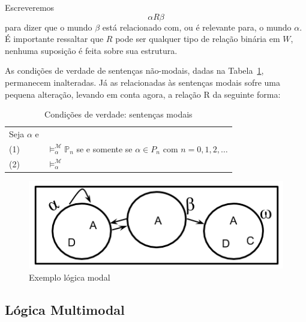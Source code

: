 Escreveremos
\begin{equation}
    \alpha R \beta
\end{equation}
para dizer que o mundo $\beta$ está relacionado com, ou é relevante para, o
mundo $\alpha$. É importante ressaltar que $R$ pode ser qualquer tipo de relação
binária em $W$, nenhuma suposição é feita sobre sua estrutura.

As condições de verdade de sentenças não-modais, dadas na
Tabela~\ref{table:truth}, permanecem inalteradas. Já as relacionadas às
sentenças modais sofre uma pequena alteração, levando em conta agora, a relação
R da seguinte forma:

    \begin{table}[h!]
\label{table:truth}
\begin{center}
    \caption{Condições de verdade: sentenças modais}
    \begin{tabular}{ll}
    Seja $\alpha$ e  \\

        \vspace{2mm}
        (1) & $\models ^{\mathcal{M}}_{\alpha} \mathbb{P}_n$ se e somente se $\alpha \in
        P_n$ com $n=0,1,2,\ldots$\\
        (2)  & $\models ^{\mathcal{M}}_{\alpha} $\\

    \end{tabular}
\end{center}
\end{table}

\begin{figure}
\label{figure:mundos_relacao}
\begin{center}
\includegraphics[scale=0.8]{imagens/ex_modal_relacao.png}
\caption{Exemplo lógica modal}
\end{center}
\end{figure}

\subsection{Lógica Multimodal}
\label{sub:lógica_multimodal}


